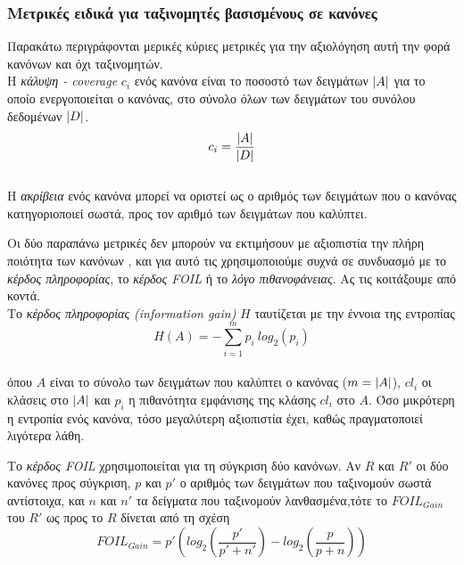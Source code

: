 \subsubsection{Μετρικές ειδικά για ταξινομητές βασισμένους σε κανόνες}
Παρακάτω περιγράφονται μερικές κύριες μετρικές για την αξιολόγηση αυτή την φορά κανόνων και όχι ταξινομητών.
\\

Η \emph{κάλυψη - coverage} $c_{i}$ ενός κανόνα είναι το ποσοστό των δειγμάτων $\lvert A\rvert$ για το οποίο ενεργοποιείται ο κανόνας, στο σύνολο όλων των δειγμάτων του συνόλου δεδομένων $\lvert D\rvert$.
\begin{equation} 
c_i=\frac{\lvert A\rvert}{\lvert D\rvert} 
\end{equation}
\\

H \emph{ακρίβεια} ενός κανόνα μπορεί να οριστεί ως ο αριθμός των δειγμάτων που ο κανόνας κατηγοριοποιεί σωστά, προς τον αριθμό των δειγμάτων που καλύπτει.

Οι δύο παραπάνω μετρικές δεν μπορούν να εκτιμήσουν με αξιοπιστία την πλήρη ποιότητα των κανόνων \cite{han2006data}, και για αυτό τις χρησιμοποιούμε συχνά σε συνδυασμό με το \emph{κέρδος πληροφορίας}, το \emph{κέρδος FOIL} ή το \emph{λόγο πιθανοφάνειας}. Ας τις κοιτάξουμε από κοντά.
\\

Το \emph{κέρδος πληροφορίας (information gain)} $H$ ταυτίζεται με την έννοια της εντροπίας
\begin{equation} 
H(A)=-\sum_{i=1}^{m} p_{i}\:log_{2}(p_{i}) 
\end{equation} 
\\
όπου $A$ είναι το σύνολο των δειγμάτων που καλύπτει ο κανόνας ($m = \lvert A\rvert$), $cl_{i}$ οι κλάσεις στο $\lvert A\rvert$ και $p_{i}$ η πιθανότητα εμφάνισης της κλάσης $cl_{i}$ στο $A$. Όσο μικρότερη η εντροπία ενός κανόνα, τόσο μεγαλύτερη αξιοπιστία έχει, καθώς πραγματοποιεί λιγότερα λάθη.


Το \emph{κέρδος FOIL} χρησιμοποιείται για τη σύγκριση δύο κανόνων. Αν $R$ και $R'$ οι δύο κανόνες προς σύγκριση, $p$ και $p'$ ο αριθμός των δειγμάτων που ταξινομούν σωστά  αντίστοιχα, και $n$ και $n'$ τα δείγματα που ταξινομούν λανθασμένα,τότε το $FOIL_{Gain}$ του $R'$ ως προς το $R$ δίνεται από τη σχέση 
\begin{equation} 
FOIL_{Gain}=p' \left( log_{2} \left( \frac{p'}{p'+n'}\right)-log_{2} \left( \frac{p}{p+n} \right)   \right) 
\end{equation} 
\\

